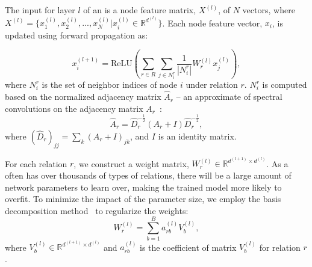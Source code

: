  The input for layer $l$ of an \RGCN is a node feature matrix, $X^{(l)}$, of $N$ vectors, where $X^{(l)} =\{x^{(l)}_1,x^{(l)}_2,...,x^{(l)}_{N}
 |x^{(l)}_{i} \in \mathbb{R}^{d^{(l)}}\}$. Each node feature vector, $x_i$, is updated using forward propagation as:

	\begin{equation}
	x_i^{(l+1)}=\mathrm{ReLU} (\sum\limits_{r \in R}\sum\limits_{j \in N_i^r}\frac{1}{|N_i^r|}W_r^{(l)}x_j^{(l)}),
	\end{equation} where $N_i^r$ is the set of neighbor indices of node $i$ under relation $r$.
	$N_i^r$ is computed based on the normalized adjacency
matrix $\hat A_r$ -- an approximate of spectral convolutions on the adjacency matrix $A_r$~\cite{Kipf2016Semi}:
	\begin{equation}
	\hat A_r=\hat D_r^{- \frac{1}{2}}(A_r+I)\hat D_r^{- \frac{1}{2}},
	\end{equation}
	where $(\hat D_r)_{jj}=\sum_k(A_r+I)_{jk}$, and $I$ is an identity matrix.

	
	 For each relation $r$, we construct a weight matrix, $W_r^{(l)} \in \mathbb{R}^{d^{(l+1)}
\times d^{(l)}}$. As a \KG often has over thousands of types of relations, there will be a large amount of network parameters to learn
over, making the trained model more likely to overfit. To minimize the impact of the parameter size, we employ the basis decomposition
method~\cite{Schlichtkrull2017Modeling} to regularize the weights:
	\begin{equation}
	W_r^{(l)}=\sum\limits_{b=1}^B a_{rb}^{(l)}V_b^{(l)},
	\end{equation}
	where $V_b^{(l)} \in \mathbb{R}^{d^{(l+1)} \times d^{(l)}}$ and $a_{rb}^{(l)}$ is the coefficient of matrix $V_b^{(l)}$ for relation $r$.
	
	


